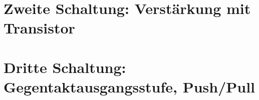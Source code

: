 \section{Zweite Schaltung: Verstärkung mit Transistor}



\section{Dritte Schaltung: Gegentaktausgangsstufe, Push/Pull}




